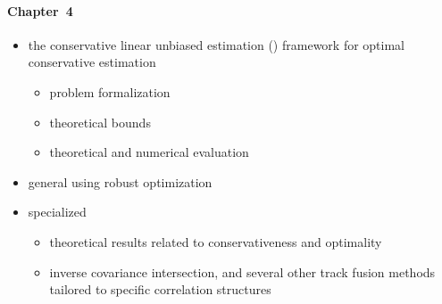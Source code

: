\paragraph{Chapter~4}
\begin{itemize}
	\item the conservative linear unbiased estimation (\abbrCLUE) framework for optimal conservative estimation
	\begin{itemize}
		\item problem formalization
		\item theoretical bounds
		\item theoretical and numerical evaluation
	\end{itemize}
	\item general \abbrCLUE using robust optimization
	\item specialized \abbrCLUE
	\begin{itemize}
		\item theoretical results related to conservativeness and optimality
		\item inverse covariance intersection, and several other track fusion methods tailored to specific correlation structures
	\end{itemize}
\end{itemize}

